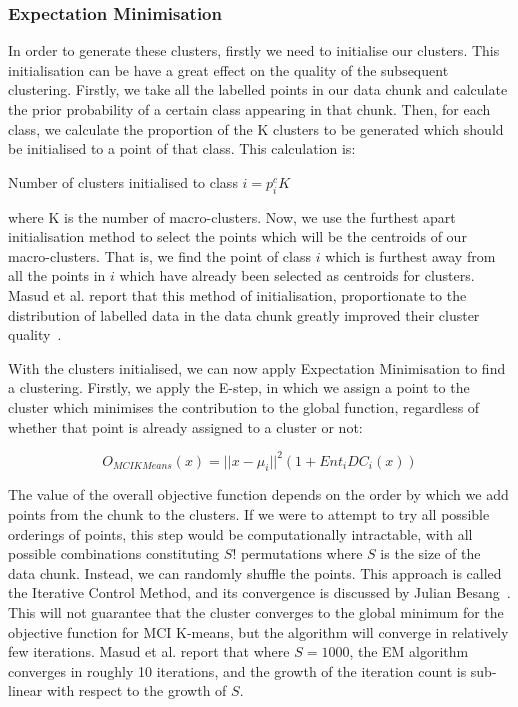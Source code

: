 \documentclass[12pt,a4paper,oneside]{report}
\begin{document}
 \subsubsection*{Expectation Minimisation} 
 In order to generate these clusters, firstly we need to initialise our clusters. This initialisation can be have a great effect on the quality of the subsequent clustering. Firstly, we take all the labelled points in our data chunk and calculate the prior probability of a certain class appearing in that chunk. Then, for each class, we calculate the proportion of the K clusters to be generated which should be initialised to a point of that class. This calculation is:
 
Number of clusters initialised to class \(i  = p_i^cK\) 

where K is the number of macro-clusters. Now, we use the furthest apart initialisation method to select the points which will be the centroids of our macro-clusters. That is, we find the point of class \(i\) which is furthest away from all the points in \(i\) which have already been selected as centroids for clusters. Masud et al. report that this method of initialisation, proportionate to the distribution of labelled data in the data chunk greatly improved their cluster quality~\cite{TechRep}.

With the clusters initialised, we can now apply Expectation Minimisation to find a clustering. Firstly, we apply the E-step, in which we assign a point to the cluster which minimises the contribution to the global function, regardless of whether that point is already assigned to a cluster or not: 

 \[O_{MCIKMeans}(x) = || x - \mu_i||^2(1 + Ent_iDC_i(x)) \]
 
The value of the overall objective function depends on the order by which we add points from the chunk to the clusters. If we were to attempt to try all possible orderings of points, this step would be computationally intractable, with all possible combinations constituting $S!$ permutations where $S$ is the size of the data chunk.  Instead, we can randomly shuffle the points. This approach is called the Iterative Control Method, and its convergence is discussed by Julian Besang~\cite{ICM}. This will not guarantee that the cluster converges to the global minimum for the objective function for MCI K-means, but the algorithm will converge in relatively few iterations. Masud et al. report that where $S = 1000$, the EM algorithm converges in roughly 10 iterations, and the growth of the iteration count is sub-linear with respect to the growth of $S$.
\end{document}
